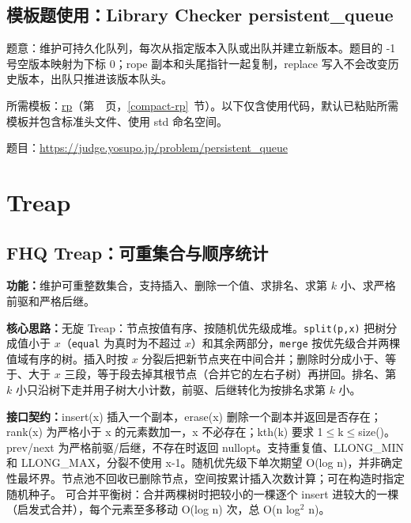 \Needspace{479pt}

\subsection*{模板题使用：Library Checker persistent\_queue}

\label{usage-example-66}

题意：维护可持久化队列，每次从指定版本入队或出队并建立新版本。题目的 -1 号空版本映射为下标 0；rope 副本和头尾指针一起复制，replace 写入不会改变历史版本，出队只推进该版本队头。

所需模板：\hyperref[compact-rp]{rp}（第~\pageref{compact-rp}~页，\ref{compact-rp}~节）。以下仅含使用代码，默认已粘贴所需模板并包含标准头文件、使用 std 命名空间。

题目：\url{https://judge.yosupo.jp/problem/persistent_queue}



\Needspace{180pt}

\section{Treap}

\subsection{FHQ Treap：可重集合与顺序统计}\label{compact-OrderedTreap}

\noindent\textbf{功能：}\allowbreak 维护可重整数集合，支持插入、删除一个值、求排名、求第 $k$ 小、求严格前驱和严格后继。

\textbf{核心思路：}\allowbreak 无旋 Treap：节点按值有序、按随机优先级成堆。\texttt{split(p,x)} 把树分成值小于 $x$（\texttt{equal} 为真时为不超过 $x$）和其余两部分，\texttt{merge} 按优先级合并两棵值域有序的树。插入时按 $x$ 分裂后把新节点夹在中间合并；删除时分成小于、等于、大于 $x$ 三段，等于段去掉其根节点（合并它的左右子树）再拼回。排名、第 $k$ 小只沿树下走并用子树大小计数，前驱、后继转化为按排名求第 $k$ 小。



{\sloppy{}\noindent\textbf{接口契约：}insert(x) 插入一个副本，erase(x) 删除一个副本并返回是否存在；rank(x) 为严格小于 x 的元素数加一，x 不必存在；kth(k) 要求 1$\le$k$\le$size()。prev/next 为严格前驱/后继，不存在时返回 nullopt。支持重复值、LLONG\_MIN 和 LLONG\_MAX，分裂不使用 x-1。随机优先级下单次期望 O(log n)，并非确定性最坏界。节点池不回收已删除节点，空间按累计插入次数计算；可在构造时指定随机种子。 可合并平衡树：合并两棵树时把较小的一棵逐个 insert 进较大的一棵（启发式合并），每个元素至多移动 O(log n) 次，总 O(n log$^{2}$ n)。\par}


